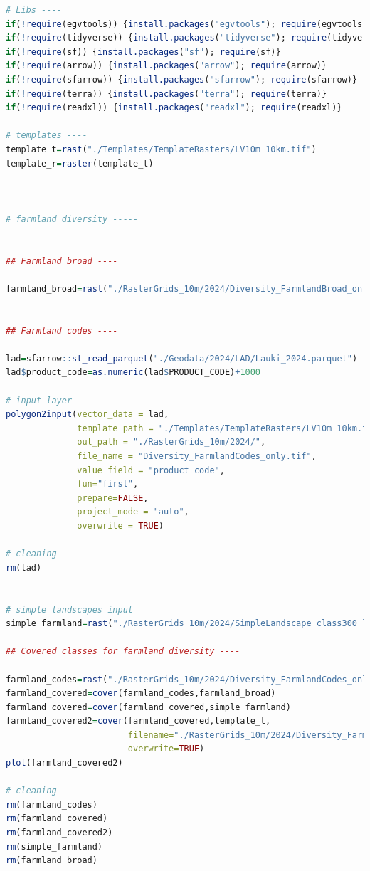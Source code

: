 \documentclass[
]{book}
\begin{document}
\begin{lstlisting}[language=R]
# Libs ----
if(!require(egvtools)) {install.packages("egvtools"); require(egvtools)}
if(!require(tidyverse)) {install.packages("tidyverse"); require(tidyverse)}
if(!require(sf)) {install.packages("sf"); require(sf)}
if(!require(arrow)) {install.packages("arrow"); require(arrow)}
if(!require(sfarrow)) {install.packages("sfarrow"); require(sfarrow)}
if(!require(terra)) {install.packages("terra"); require(terra)}
if(!require(readxl)) {install.packages("readxl"); require(readxl)}

# templates ----
template_t=rast("./Templates/TemplateRasters/LV10m_10km.tif")
template_r=raster(template_t)



# farmland diversity -----


## Farmland broad ----

farmland_broad=rast("./RasterGrids_10m/2024/Diversity_FarmlandBroad_only.tif")


## Farmland codes ----

lad=sfarrow::st_read_parquet("./Geodata/2024/LAD/Lauki_2024.parquet")
lad$product_code=as.numeric(lad$PRODUCT_CODE)+1000

# input layer
polygon2input(vector_data = lad,
              template_path = "./Templates/TemplateRasters/LV10m_10km.tif",
              out_path = "./RasterGrids_10m/2024/",
              file_name = "Diversity_FarmlandCodes_only.tif",
              value_field = "product_code",
              fun="first",
              prepare=FALSE,
              project_mode = "auto",
              overwrite = TRUE)

# cleaning
rm(lad)


# simple landscapes input 
simple_farmland=rast("./RasterGrids_10m/2024/SimpleLandscape_class300_lauki_premask.tif")

## Covered classes for farmland diversity ----

farmland_codes=rast("./RasterGrids_10m/2024/Diversity_FarmlandCodes_only.tif")
farmland_covered=cover(farmland_codes,farmland_broad)
farmland_covered=cover(farmland_covered,simple_farmland)
farmland_covered2=cover(farmland_covered,template_t,
                        filename="./RasterGrids_10m/2024/Diversity_FarmlandDetailed.tif",
                        overwrite=TRUE)
plot(farmland_covered2)

# cleaning
rm(farmland_codes)
rm(farmland_covered)
rm(farmland_covered2)
rm(simple_farmland)
rm(farmland_broad)



\end{lstlisting}
\end{document}
